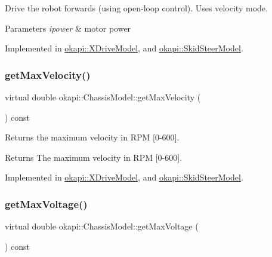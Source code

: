 Drive the robot forwards (using open-\/loop control). Uses velocity mode.


\begin{DoxyParams}{Parameters}
{\em ipower} & motor power \\
\hline
\end{DoxyParams}


Implemented in \mbox{\hyperlink{classokapi_1_1XDriveModel_a2a26c9bd57c26ca0251040a14272226c}{okapi\+::\+X\+Drive\+Model}}, and \mbox{\hyperlink{classokapi_1_1SkidSteerModel_a74ca9d9f1b0f80c9453194567c58e967}{okapi\+::\+Skid\+Steer\+Model}}.

\mbox{\label{classokapi_1_1ChassisModel_ab45dd7430636ed1c1dee25dae6df5d46}} 
\subsubsection{\texorpdfstring{getMaxVelocity()}{getMaxVelocity()}}
{\footnotesize\ttfamily virtual double okapi\+::\+Chassis\+Model\+::get\+Max\+Velocity (\begin{DoxyParamCaption}{ }\end{DoxyParamCaption}) const\hspace{0.3cm}{\ttfamily [pure virtual]}}

Returns the maximum velocity in R\+PM \mbox{[}0-\/600\mbox{]}.

\begin{DoxyReturn}{Returns}
The maximum velocity in R\+PM \mbox{[}0-\/600\mbox{]}. 
\end{DoxyReturn}


Implemented in \mbox{\hyperlink{classokapi_1_1XDriveModel_aa5b5c3431c99c612ade5c97858478828}{okapi\+::\+X\+Drive\+Model}}, and \mbox{\hyperlink{classokapi_1_1SkidSteerModel_a7e2fcfb65e940ea4d71780966b4b5b68}{okapi\+::\+Skid\+Steer\+Model}}.

\mbox{\label{classokapi_1_1ChassisModel_a3ced2121524ae523592db64733c69472}} 
\subsubsection{\texorpdfstring{getMaxVoltage()}{getMaxVoltage()}}
{\footnotesize\ttfamily virtual double okapi\+::\+Chassis\+Model\+::get\+Max\+Voltage (\begin{DoxyParamCaption}{ }\end{DoxyParamCaption}) const\hspace{0.3cm}{\ttfamily [pure virtual]}}

